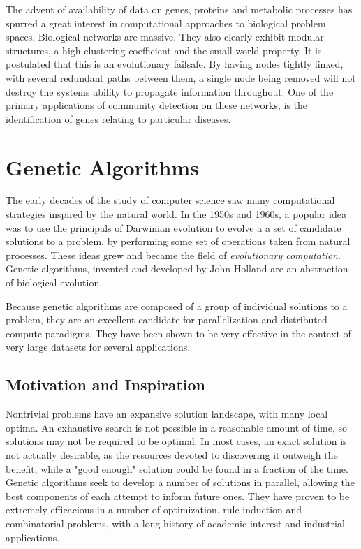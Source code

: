 The advent of availability of data on genes, proteins and metabolic processes has spurred a great interest in computational approaches to biological problem spaces. Biological networks are massive. They also clearly exhibit modular structures, a high clustering coefficient and the small world property. It is postulated that this is an evolutionary failsafe. By having nodes tightly linked, with several redundant paths between them, a single node being removed will not destroy the systems ability to propagate information throughout. One of the primary applications of community detection on these networks, is the identification of genes relating to particular diseases. 



\section{Genetic Algorithms}
The early decades of the study of computer science saw many computational strategies inspired by the natural world. In the 1950s and 1960s, a popular idea was to use the principals of Darwinian evolution to evolve a a set of candidate solutions to a problem, by performing some set of operations taken from natural processes. These ideas grew and became the field of \textit{evolutionary computation}. Genetic algorithms, invented and developed by John Holland \cite{Holland1992} are an abstraction of biological evolution.

Because genetic algorithms are composed of a group of individual solutions to a problem, they are an excellent candidate for parallelization and distributed compute paradigms. They have been shown to be very effective in the context of very large datasets for several applications\cite{Ding2007, Acharjya2015}.

\subsection{Motivation and Inspiration}
Nontrivial problems have an expansive solution landscape, with many local optima. An exhaustive search is not possible in a reasonable amount of time, so solutions may not be required to be optimal. In most cases, an exact solution is not actually desirable, as the resources devoted to discovering it outweigh the benefit, while a "good enough" solution could be found in a fraction of the time. Genetic algorithms seek to develop a number of solutions in parallel, allowing the best components of each attempt to inform future ones. They have proven to be extremely efficacious in a number of optimization, rule induction and combinatorial problems, with a long history of academic interest and industrial applications. 

